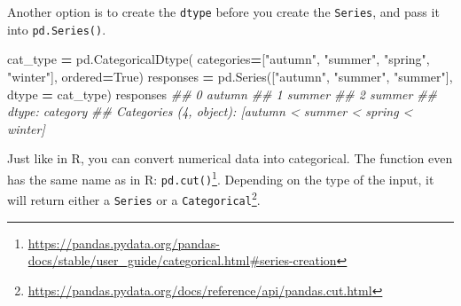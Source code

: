 \documentclass[
  12pt,
]{krantz}
\makeatletter
\newenvironment{Shaded}{\begin{snugshade}}{\end{snugshade}}
\newcommand{\CommentTok}[1]{\textcolor[rgb]{0.37,0.37,0.37}{\textit{#1}}}
\newcommand{\NormalTok}[1]{#1}
\newcommand{\OperatorTok}[1]{\textcolor[rgb]{0.43,0.43,0.43}{\textbf{#1}}}
\newcommand{\StringTok}[1]{\textcolor[rgb]{0.5,0.5,0.5}{#1}}
\newcommand{\VariableTok}[1]{\textcolor[rgb]{0,0,0}{#1}}
\renewcommand{\href}[2]{#2\footnote{\url{#1}}}
\newenvironment{kframe}{%
\medskip{}
\setlength{\fboxsep}{.8em}
 \def\at@end@of@kframe{}%
 \ifinner\ifhmode%
  \def\at@end@of@kframe{\end{minipage}}%
  \begin{minipage}{\columnwidth}%
 \fi\fi%
 \def\FrameCommand##1{\hskip\@totalleftmargin \hskip-\fboxsep
 \colorbox{shadecolor}{##1}\hskip-\fboxsep
     \hskip-\linewidth \hskip-\@totalleftmargin \hskip\columnwidth}%
 \MakeFramed {\advance\hsize-\width
   \@totalleftmargin\z@ \linewidth\hsize
   \@setminipage}}%
 {\par\unskip\endMakeFramed%
 \at@end@of@kframe}
\renewenvironment{Shaded}{\begin{kframe}}{\end{kframe}}
\makeatother
\begin{document}
Another option is to create the \texttt{dtype} before you create the \texttt{Series}, and pass it into \texttt{pd.Series()}.

\begin{Shaded}
\begin{Highlighting}[]
\NormalTok{cat\_type }\OperatorTok{=}\NormalTok{ pd.CategoricalDtype(}
\NormalTok{                  categories}\OperatorTok{=}\NormalTok{[}\StringTok{"autumn"}\NormalTok{, }\StringTok{"summer"}\NormalTok{, }\StringTok{"spring"}\NormalTok{, }\StringTok{"winter"}\NormalTok{],}
\NormalTok{                  ordered}\OperatorTok{=}\VariableTok{True}\NormalTok{)}
\NormalTok{responses }\OperatorTok{=}\NormalTok{ pd.Series([}\StringTok{"autumn"}\NormalTok{, }\StringTok{"summer"}\NormalTok{, }\StringTok{"summer"}\NormalTok{], dtype }\OperatorTok{=}\NormalTok{ cat\_type)}
\NormalTok{responses}
\CommentTok{\#\# 0    autumn}
\CommentTok{\#\# 1    summer}
\CommentTok{\#\# 2    summer}
\CommentTok{\#\# dtype: category}
\CommentTok{\#\# Categories (4, object): [\textquotesingle{}autumn\textquotesingle{} \textless{} \textquotesingle{}summer\textquotesingle{} \textless{} \textquotesingle{}spring\textquotesingle{} \textless{} \textquotesingle{}winter\textquotesingle{}]}
\end{Highlighting}
\end{Shaded}

Just like in R, you can convert numerical data into categorical. The function even has the same name as in R: \href{https://pandas.pydata.org/pandas-docs/stable/user_guide/categorical.html\#series-creation}{\texttt{pd.cut()}}. Depending on the type of the input, \href{https://pandas.pydata.org/docs/reference/api/pandas.cut.html}{it will return either a \texttt{Series} or a \texttt{Categorical}}.
\end{document}
